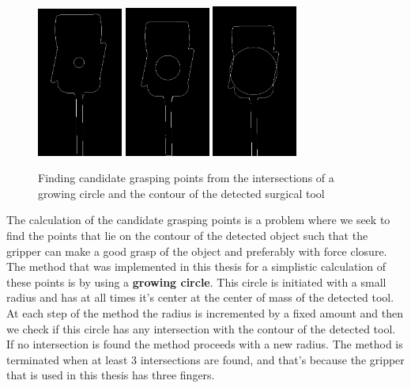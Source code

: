 \begin{center}
\begin{figure}[!htb]
\centering
\includegraphics[width=0.25\textwidth]{images/grasp_points_1.png}
\includegraphics[width=0.25\textwidth]{images/grasp_points_2.png}
\includegraphics[width=0.25\textwidth]{images/grasp_points_3.png}\\
\caption{Finding candidate grasping points from the intersections of a growing circle and the contour of the detected surgical tool}
\end{figure}
\end{center}

The calculation of the candidate grasping points is a problem where we seek to find the points that lie on the contour of the detected object such that the gripper can make a good grasp of the object and preferably with 
force closure. The method that was implemented in this thesis for a simplistic calculation of these points is by using a \textbf{growing circle}. This circle is initiated with a small radius and has at all times it's center at the 
center of mass of the detected tool. At each step of the method the radius is incremented by a fixed amount and then we check if this circle has any intersection with the contour of the detected tool. If no intersection 
is found the method proceeds with a new radius. The method is terminated when at least 3 intersections are found, and that's because the gripper that is used in this thesis has three fingers.

